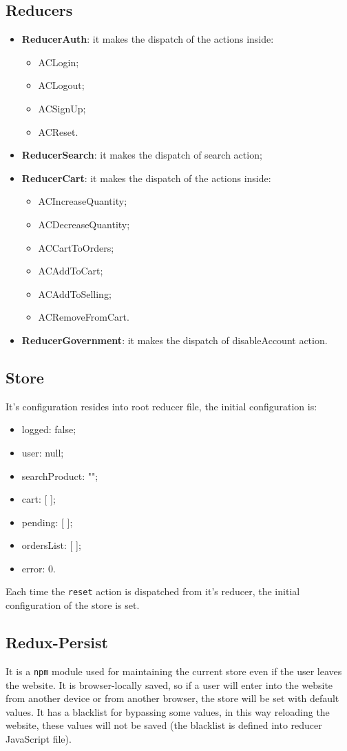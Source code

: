 \begin{itemize}
\subsection{Reducers}
\begin{itemize}
	\item \textbf{ReducerAuth}: it makes the dispatch of the actions inside:
	\begin{itemize}
		\item ACLogin;
		\item ACLogout;
		\item ACSignUp;
		\item ACReset.
	\end{itemize}
	\item \textbf{ReducerSearch}: it makes the dispatch of search action;
	\item \textbf{ReducerCart}: it makes the dispatch of the actions inside:
	\begin{itemize}
		\item ACIncreaseQuantity;
		\item ACDecreaseQuantity;
		\item ACCartToOrders;
		\item ACAddToCart;
		\item ACAddToSelling;
		\item ACRemoveFromCart.
	\end{itemize}
	\item \textbf{ReducerGovernment}: it makes the dispatch of disableAccount action.
\end{itemize}
\subsection{Store}
It's configuration resides into root reducer file, the initial configuration is:
\begin{itemize}
	\item logged: false;
	\item user: null;
	\item searchProduct: "";
	\item cart: [ ];
	\item pending: [ ];
	\item ordersList: [ ];
	\item error: 0.
\end{itemize}
Each time the \texttt{reset} action is dispatched from it's reducer, the initial configuration of the store is set.

\subsection{Redux-Persist}
It is a \texttt{npm} module used for maintaining the current store even if the user leaves the website. It is browser-locally saved, so if a user will enter into the website from another device or from another browser, the store will be set with default values. It has a blacklist for bypassing some values, in this way reloading the website, these values will not be saved (the blacklist is defined into reducer JavaScript file).


\end{itemize}
